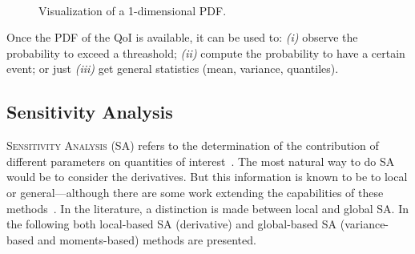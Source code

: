 \begin{figure}[!h]               
\centering
{}
 ~       
\caption{Visualization of a 1-dimensional PDF.}
\label{fig:ex_pdf}
\end{figure}

Once the PDF of the QoI is available, it can be used to: \emph{(i)} observe the probability to exceed a threashold; \emph{(ii)} compute the probability to have a certain event; or just \emph{(iii)} get general statistics (mean, variance, quantiles).

\subsection{Sensitivity Analysis}\label{sec:sa}
\lettrine{S}{ensitivity Analysis} (SA) refers to the determination of the contribution of different parameters on quantities of interest~\cite{saltelli2007,iooss2016}. The most natural way to do SA would be to consider the derivatives. But this information is known to be to local or general---although there are some work extending the capabilities of these methods~\cite{kucherenko2016}. In the literature, a distinction is made between local and global SA. In the following both local-based SA (derivative) and global-based SA (variance-based and moments-based) methods are presented.

